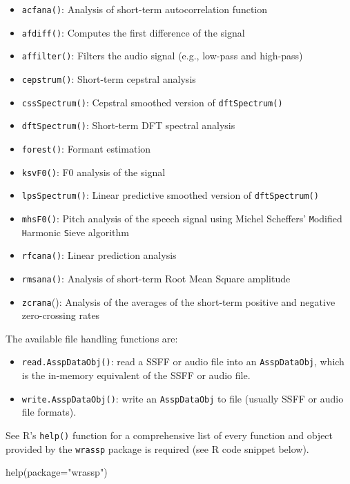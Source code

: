 \documentclass[
]{book}
\newenvironment{Shaded}{\begin{snugshade}}{\end{snugshade}}
\newcommand{\AttributeTok}[1]{\textcolor[rgb]{0.77,0.63,0.00}{#1}}
\newcommand{\FunctionTok}[1]{\textcolor[rgb]{0.00,0.00,0.00}{#1}}
\newcommand{\NormalTok}[1]{#1}
\newcommand{\StringTok}[1]{\textcolor[rgb]{0.31,0.60,0.02}{#1}}
\providecommand{\tightlist}{%
  \setlength{\itemsep}{0pt}\setlength{\parskip}{0pt}}
\begin{document}
\begin{itemize}
\tightlist
\item
  \texttt{acfana()}: Analysis of short-term autocorrelation function
\item
  \texttt{afdiff()}: Computes the first difference of the signal
\item
  \texttt{affilter()}: Filters the audio signal (e.g., low-pass and high-pass)
\item
  \texttt{cepstrum()}: Short-term cepstral analysis
\item
  \texttt{cssSpectrum()}: Cepstral smoothed version of \texttt{dftSpectrum()}
\item
  \texttt{dftSpectrum()}: Short-term DFT spectral analysis
\item
  \texttt{forest()}: Formant estimation
\item
  \texttt{ksvF0()}: F0 analysis of the signal
\item
  \texttt{lpsSpectrum()}: Linear predictive smoothed version of \texttt{dftSpectrum()}
\item
  \texttt{mhsF0()}: Pitch analysis of the speech signal using Michel Scheffers' \texttt{M}odified \texttt{H}armonic \texttt{S}ieve algorithm
\item
  \texttt{rfcana()}: Linear prediction analysis
\item
  \texttt{rmsana()}: Analysis of short-term Root Mean Square amplitude
\item
  \texttt{zcrana}(): Analysis of the averages of the short-term positive and negative zero-crossing rates
\end{itemize}

The available file handling functions are:

\begin{itemize}
\tightlist
\item
  \texttt{read.AsspDataObj()}: read a SSFF or audio file into an \texttt{AsspDataObj}, which is the in-memory equivalent of the SSFF or audio file.
\item
  \texttt{write.AsspDataObj()}: write an \texttt{AsspDataObj} to file (usually SSFF or audio file formats).
\end{itemize}

See R's \texttt{help()} function for a comprehensive list of every function and object provided by the \texttt{wrassp} package is required (see R code snippet below).

\begin{Shaded}
\begin{Highlighting}[]
\FunctionTok{help}\NormalTok{(}\AttributeTok{package=}\StringTok{"wrassp"}\NormalTok{)}
\end{Highlighting}
\end{Shaded}
\end{document}
